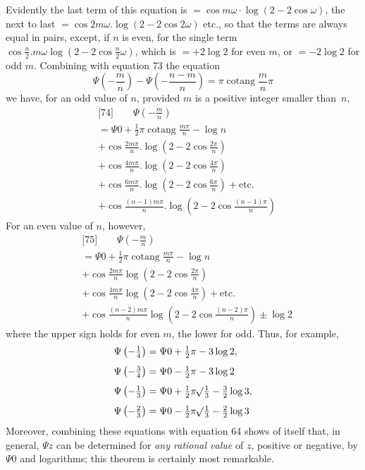 Evidently the last term of this equation is $=\cos m\omega\cdot\log(2-2\cos\omega)$, the next to last $=\cos 2m\omega.\log(2-2\cos 2\omega)$ etc., so that the terms are always equal in pairs, except, if $n$ is even, for the single term $\cos\frac{n}{2}.m\omega\log(2-2\cos\frac{n}{2}\omega)$, which is $=+2\log 2$ for even $m$, or $=-2\log 2$ for odd $m$. Combining with equation 73 the equation
\[
\Psi\left(-\frac{m}{n}\right)-\Psi\left(-\frac{n-m}{n}\right)=\pi\operatorname{cotang}\frac{m}{n}\pi
\]
we have, for an odd value of $n$, provided $m$ is a positive integer smaller \mbox{than $n$},
\[
\begin{aligned}
&{}\text{[74]}\qquad \Psi\left(-\frac{m}{n}\right)
\\[4pt]
&=\Psi 0+\tfrac12\pi\operatorname{cotang}\frac{m\pi}{n}-\log n\\[4pt]
&+\cos\frac{2m\pi}{n}.\log\left(2-2\cos\frac{2\pi}{n}\right)
\\[4pt]
&+\cos\frac{4m\pi}{n}.\log\left(2-2\cos\frac{4\pi}{n}\right)\\[4pt]
&+\cos\frac{6m\pi}{n}.\log\left(2-2\cos\frac{6\pi}{n}\right)+\text{etc.}
\\[4pt]
&+\cos\frac{(n-1)m\pi}{n}.\log\left(2-2\cos\frac{(n-1)\pi}{n}\right)
\end{aligned}
\]
For an even value of $n$, however,
\[
\begin{aligned}
&{}\text{[75]}\qquad \Psi\left(-\frac{m}{n}\right)
\\[4pt]
&=\Psi 0+\tfrac12\pi\operatorname{cotang}\frac{m\pi}{n}-\log n\\[4pt]
&+\cos\frac{2m\pi}{n}\log\left(2-2\cos\frac{2\pi}{n}\right)
\\[4pt]
&+\cos\frac{4m\pi}{n}\log\left(2-2\cos\frac{4\pi}{n}\right)+\text{etc.}\\[4pt]
&+\cos\frac{(n-2)m\pi}{n}\log\left(2-2\cos\frac{(n-2)\pi}{n}\right)
\pm\log 2
\end{aligned}
\]
where the upper sign holds for even $m$, the lower for odd. Thus, for example,
\[
\begin{aligned}
&\Psi\left(-\tfrac14\right)=\Psi 0+\tfrac12\pi-3\log 2, 
\\[4pt]
&\Psi\left(-\tfrac34\right)=\Psi 0-\tfrac12\pi-3\log 2
\\[4pt]
&\Psi\left(-\tfrac13\right)=\Psi 0+\tfrac12\pi\mathord{{}^{}\!\surd}\tfrac13-\tfrac32\log 3, 
\\[4pt]
&\Psi\left(-\tfrac23\right)=\Psi 0-\tfrac12\pi\mathord{{}^{}\!\surd}\tfrac13-\tfrac22\log 3
\end{aligned}
\]
Moreover, combining these equations with equation 64 shows of itself that, in general, $\Psi z$ can be determined for \emph{any rational value} of $z$, positive or negative, by $\Psi 0$ and logarithms; this theorem is certainly most remarkable.

